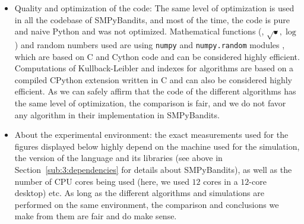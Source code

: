 \begin{itemize}
    \item Quality and optimization of the code:
    The same level of optimization is used in all the codebase of SMPyBandits, and most of the time, the code is pure and naive Python and was not optimized.
    Mathematical functions (\eg, $\sqrt{\bullet}, \log$) and random numbers used are using \texttt{numpy} and \texttt{numpy.random} modules \cite{numpy}, which are based on C and Cython code \cite{cython} and can be considered highly efficient.
    Computations of Kullback-Leibler and indexes for \klUCB{} algorithms are based on a compiled CPython extension written in C \cite{python} and can also be considered highly efficient.
    As we can safely affirm that the code of the different algorithms has the same level of optimization, the comparison is fair, and we do not favor any algorithm in their implementation in SMPyBandits.

    \item About the experimental environment:
    the exact measurements used for the figures displayed below highly depend on the machine used for the simulation, the version of the language and its libraries (see above in Section~\ref{sub:3:dependencies} for details about SMPyBandits), as well as the number of CPU cores being used (here, we used $12$ cores in a $12$-core desktop) etc.
    As long as the different algorithms and simulations are performed on the same environment, the comparison and conclusions we make from them are fair and do make sense.

\end{itemize}

